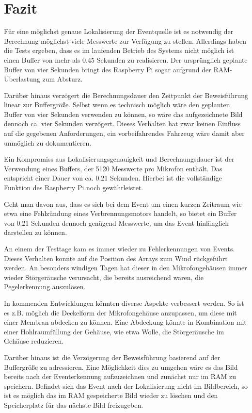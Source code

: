 \section{Fazit}

Für eine möglichst genaue Lokalisierung der Eventquelle ist es notwendig der Berechnung möglichst viele Messwerte zur Verfügung zu stellen. Allerdings haben die Tests ergeben, dass es im laufenden Betrieb des Systems nicht möglich ist einen Buffer von mehr als 0.45 Sekunden zu realisieren. Der ursprünglich geplante Buffer von vier Sekunden bringt des Raspberry Pi sogar aufgrund der RAM-Überlastung zum Absturz.

Darüber hinaus verzögert die Berechnungsdauer den Zeitpunkt der Beweisführung linear zur Buffergröße. Selbst wenn es technisch möglich wäre den geplanten Buffer von vier Sekunden verwenden zu können, so wäre das aufgezeichnete Bild dennoch ca. vier Sekunden verzögert. Dieses Verhalten hat zwar keinen Einfluss auf die gegebenen Anforderungen, ein vorbeifahrendes Fahrzeug wäre damit aber unmöglich zu dokumentieren. 

Ein Kompromiss aus Lokalisierungsgenauigkeit und Berechnungsdauer ist der Verwendung eines Buffers, der 5120 Messwerte pro Mikrofon enthält. Das entspricht einer Dauer von ca. 0.21 Sekunden. Hierbei ist die vollständige Funktion des Raspberry Pi noch gewährleistet. 

Geht man davon aus, dass es sich bei dem Event um einen kurzen Zeitraum wie etwa eine Fehlzündung eines Verbrennungsmotors handelt, so bietet ein Buffer von 0.21 Sekunden dennoch genügend Messwerte, um das Event hinlänglich darstellen zu können. 

An einem der Testtage kam es immer wieder zu Fehlerkennungen von Events. Dieses Verhalten konnte auf die Position des Arrays zum Wind rückgeführt werden. An besonders windigen Tagen hat dieser in den Mikrofongehäusen immer wieder Störgeräusche verursacht, die bereits ausreichend waren, die Pegelerkennung auszulösen. 

In kommenden Entwicklungen könnten diverse Aspekte verbessert werden. So ist es z.B. möglich die Deckelform der Mikrofongehäuse anzupassen, um diese mit einer Membran abdecken zu können. Eine Abdeckung könnte in Kombination mit einer Hohlraumfüllung der Gehäuse, wie etwa Wolle, die Störgeräusche im Gehäuse reduzieren. 

Darüber hinaus ist die Verzögerung der Beweisführung basierend auf der Buffergröße zu adressieren. Eine Möglichkeit dies zu umgehen wäre es das Bild bereits nach der Eventerkennung aufzuzeichnen und zunächst nur im RAM zu speichern. Befindet sich das Event nach der Lokalisierung nicht im Bildbereich, so ist es möglich das im RAM gespeicherte Bild wieder zu löschen und den Speicherplatz für das nächste Bild freizugeben. 

